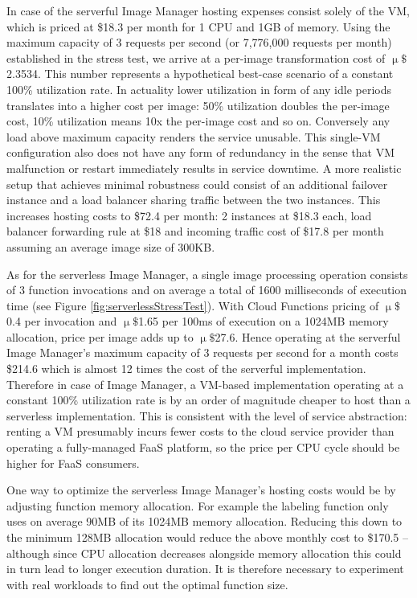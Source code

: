 In case of the serverful Image Manager hosting expenses consist solely of the VM, which is priced at \$18.3 per month for 1 CPU and 1GB of memory. Using the maximum capacity of 3 requests per second (or 7,776,000 requests per month) established in the stress test, we arrive at a per-image transformation cost of $\upmu\$$2.3534. This number represents a hypothetical best-case scenario of a constant 100\% utilization rate. In actuality lower utilization in form of any idle periods translates into a higher cost per image: 50\% utilization doubles the per-image cost, 10\% utilization means 10x the per-image cost and so on. Conversely any load above maximum capacity renders the service unusable. This single-VM configuration also does not have any form of redundancy in the sense that VM malfunction or restart immediately results in service downtime. A more realistic setup that achieves minimal robustness could consist of an additional failover instance and a load balancer sharing traffic between the two instances. This increases hosting costs to \$72.4 per month: 2 instances at \$18.3 each, load balancer forwarding rule at \$18 and incoming traffic cost of \$17.8 per month assuming an average image size of 300KB. \parencite{google18cloudFunctions}

As for the serverless Image Manager, a single image processing operation consists of 3 function invocations and on average a total of 1600 milliseconds of execution time (see Figure \ref{fig:serverlessStressTest}). With Cloud Functions pricing of $\upmu\$$0.4 per invocation and $\upmu\$$1.65 per 100ms of execution on a 1024MB memory allocation, price per image adds up to $\upmu\$$27.6. Hence operating at the serverful Image Manager's maximum capacity of 3 requests per second for a month costs \$214.6 which is almost 12 times the cost of the serverful implementation. Therefore in case of Image Manager, a VM-based implementation operating at a constant 100\% utilization rate is by an order of magnitude cheaper to host than a serverless implementation. This is consistent with the level of service abstraction: renting a VM presumably incurs fewer costs to the cloud service provider than operating a fully-managed FaaS platform, so the price per CPU cycle should be higher for FaaS consumers. \parencite{google18cloudFunctions}

One way to optimize the serverless Image Manager's hosting costs would be by adjusting function memory allocation. For example the labeling function only uses on average 90MB of its 1024MB memory allocation. Reducing this down to the minimum 128MB allocation would reduce the above monthly cost to \$170.5 -- although since CPU allocation decreases alongside memory allocation this could in turn lead to longer execution duration. It is therefore necessary to experiment with real workloads to find out the optimal function size.

